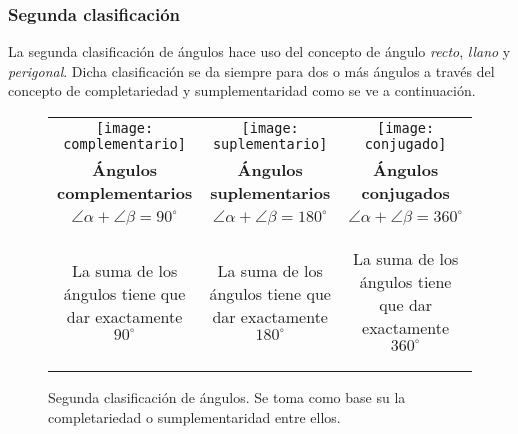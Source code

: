 \subsubsection{Segunda clasificación}

La segunda clasificación de ángulos hace uso del concepto de ángulo 
\textit{recto}, \textit{llano} y \textit{perigonal}. Dicha clasificación se 
da siempre para dos o más ángulos a través del concepto de completariedad y 
sumplementaridad como se ve a continuación.


\begin{figure*}[h!]
\def\arraystretch{1.5}%
\caption[Clasificación de ángulos]{Segunda clasificación de ángulos. 
	Se toma como base su la completariedad o sumplementaridad entre ellos.
}
\label{clasifangulosdos}
\begin{tabular}{c | c | c }
	\texttt{[image: complementario]} & 
	\texttt{[image: suplementario]}  & 
	\texttt{[image: conjugado]} 
	\\ %

	\textbf{Ángulos complementarios} & 
	\textbf{Ángulos suplementarios} & 
	\textbf{Ángulos conjugados}                       
	\\ %

	$\angle \alpha + \angle \beta= 90^\circ$ &
	$\angle \alpha + \angle \beta= 180^\circ$ &
	$\angle \alpha + \angle \beta= 360^\circ$ 
	\\

	\parbox{4cm}{
		\begin{center}
			La suma de los ángulos tiene que dar exactamente $90^\circ$
		\end{center} 
	} & 
	\parbox{4cm}{
		\begin{center}
			La suma de los ángulos tiene que dar exactamente $180^\circ$
		\end{center} 
	} & 
	\parbox{4cm}{
		\begin{center}
			La suma de los ángulos tiene que dar exactamente $360^\circ$
		\end{center} 
	}                                 

\end{tabular}
\end{figure*}

